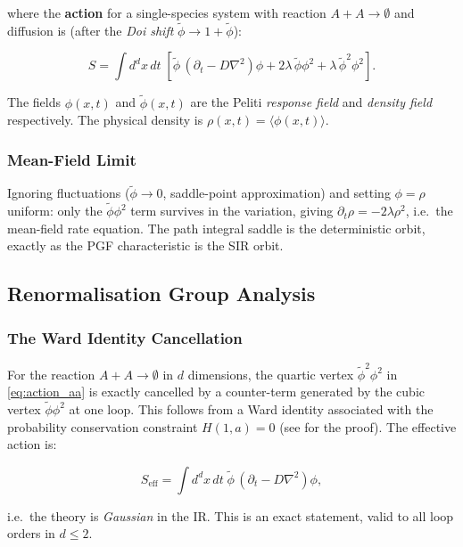 \documentclass[11pt,a4paper]{article}
\theoremstyle{definition}
\begin{document}
where the \textbf{action} for a single-species system with reaction $A+A\to\emptyset$
and diffusion is (after the \emph{Doi shift} $\tilde\phi \to 1 + \tilde\phi$):

\begin{equation}
  S = \int d^dx\,dt\; \left[
    \tilde\phi\,(\partial_t - D\nabla^2)\phi
    + 2\lambda\,\tilde\phi\phi^2
    + \lambda\,\tilde\phi^2\phi^2
  \right].
  \label{eq:action_aa}
\end{equation}

The fields $\phi(x,t)$ and $\tilde\phi(x,t)$ are the Peliti \emph{response field}
and \emph{density field} respectively. The physical density is $\rho(x,t) = \langle\phi(x,t)\rangle$.

\subsubsection{Mean-Field Limit}

Ignoring fluctuations ($\tilde\phi \to 0$, saddle-point approximation) and setting
$\phi = \rho$ uniform: only the $\tilde\phi\phi^2$ term survives in the variation,
giving $\partial_t\rho = -2\lambda\rho^2$, i.e.\ the mean-field rate equation.
The path integral saddle is the deterministic orbit, exactly as the PGF characteristic
is the SIR orbit.

\subsection{Renormalisation Group Analysis}

\subsubsection{The Ward Identity Cancellation}

For the reaction $A+A\to\emptyset$ in $d$ dimensions, the quartic vertex
$\tilde\phi^2\phi^2$ in \eqref{eq:action_aa} is exactly cancelled by a
counter-term generated by the cubic vertex $\tilde\phi\phi^2$ at one loop.
This follows from a Ward identity associated with the probability conservation
constraint $H(1, a) = 0$ (see \cite{tauber2005} for the proof). The effective action is:

\begin{equation}
  S_\mathrm{eff} = \int d^dx\,dt\; \tilde\phi\,(\partial_t - D\nabla^2)\phi,
  \label{eq:action_free}
\end{equation}

i.e.\ the theory is \emph{Gaussian} in the IR. This is an exact statement,
valid to all loop orders in $d \leq 2$.
\end{document}
